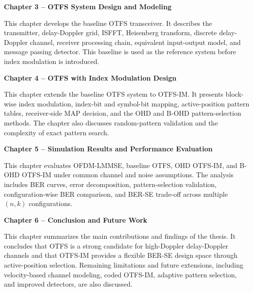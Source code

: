 \textbf{Chapter 3 -- OTFS System Design and Modeling}

This chapter develops the baseline OTFS transceiver. It describes the transmitter, delay-Doppler grid, ISFFT, Heisenberg transform, discrete delay-Doppler channel, receiver processing chain, equivalent input-output model, and message passing detector. This baseline is used as the reference system before index modulation is introduced.

\textbf{Chapter 4 -- OTFS with Index Modulation Design}

This chapter extends the baseline OTFS system to OTFS-IM. It presents block-wise index modulation, index-bit and symbol-bit mapping, active-position pattern tables, receiver-side MAP decision, and the OHD and B-OHD pattern-selection methods. The chapter also discusses random-pattern validation and the complexity of exact pattern search.

\textbf{Chapter 5 -- Simulation Results and Performance Evaluation}

This chapter evaluates OFDM-LMMSE, baseline OTFS, OHD OTFS-IM, and B-OHD OTFS-IM under common channel and noise assumptions. The analysis includes BER curves, error decomposition, pattern-selection validation, configuration-wise BER comparison, and BER-SE trade-off across multiple \((n,k)\) configurations.

\textbf{Chapter 6 -- Conclusion and Future Work}

This chapter summarizes the main contributions and findings of the thesis. It concludes that OTFS is a strong candidate for high-Doppler delay-Doppler channels and that OTFS-IM provides a flexible BER-SE design space through active-position selection. Remaining limitations and future extensions, including velocity-based channel modeling, coded OTFS-IM, adaptive pattern selection, and improved detectors, are also discussed.

\cleardoublepage
